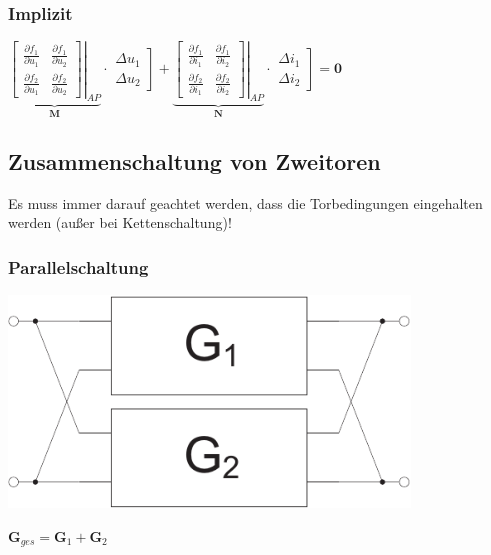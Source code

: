 \documentclass[a4paper,twocolumn,10pt]{article}
\begin{document}
\subsubsection*{Implizit}
$\underbrace{\left.\begin{bmatrix}\frac{\partial f_1}{\partial u_1} & \frac{\partial f_1}{\partial u_2}\\ \frac{\partial f_2}{\partial u_1} & \frac{\partial f_2}{\partial u_2}\end{bmatrix}\right|_{AP}}_{\textbf{M}}\cdot \left.\begin{matrix}\Delta u_1\\ \Delta u_2\end{matrix}\right]+ \underbrace{\left.\begin{bmatrix}\frac{\partial f_1}{\partial i_1} & \frac{\partial f_1}{\partial i_2}\\ \frac{\partial f_2}{\partial i_1} & \frac{\partial f_2}{\partial i_2}\end{bmatrix}\right|_{AP}}_{\textbf{N}}\cdot \left.\begin{matrix}\Delta i_1\\ \Delta i_2\end{matrix}\right]=\textbf{0}$

\subsection*{Zusammenschaltung von Zweitoren}
Es muss immer darauf geachtet werden, dass die Torbedingungen eingehalten werden (außer bei Kettenschaltung)!
\subsubsection*{Parallelschaltung}
\begin{minipage}[b]{0.23\textwidth}
\includegraphics[width=0.8\textwidth]{Grafiken/Zweitor_Parallel}
\end{minipage}
\hfill
\begin{minipage}[b]{0.23\textwidth}
$\textbf{G}_{ges}=\textbf{G}_1+\textbf{G}_2$\\\\
\end{minipage}
\end{document}
